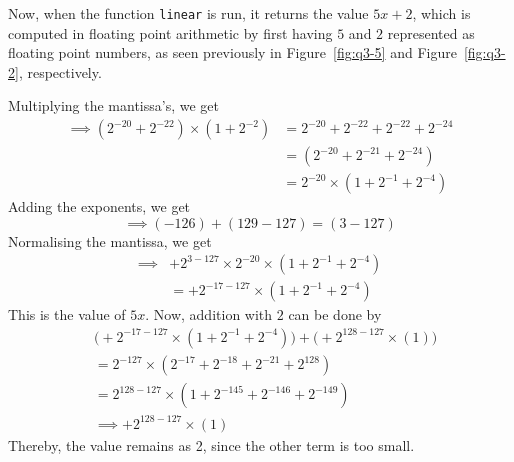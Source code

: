 Now, when the function \texttt{linear} is run, it returns the value \( 5x + 2 \), which is computed in floating point arithmetic by first having \( 5 \) and \( 2 \) represented as floating point numbers, as seen previously in Figure~\ref{fig:q3-5} and Figure~\ref{fig:q3-2}, respectively.

Multiplying the mantissa's, we get
\begin{align*}
    \implies
    (2^{-20} + 2^{-22}) \times (1 + 2^{-2})
     & =
    2^{-20} + 2^{-22} + 2^{-22} + 2^{-24}
    \\ & =
    (2^{-20} + 2^{-21}+ 2^{-24})
    \\ & =
    2^{-20} \times (1 + 2^{-1}+ 2^{-4})
\end{align*}
Adding the exponents, we get
\[
    \implies
    (-126) + (129 - 127)
    =
    (3 - 127)
\]
Normalising the mantissa, we get
\begin{align*}
    \implies
     &
    + 2^{3 - 127} \times 2^{-20} \times (1 + 2^{-1}+ 2^{-4})
    \\ & =
    + 2^{-17 - 127} \times (1 + 2^{-1}+ 2^{-4})
\end{align*}
This is the value of \( 5x \).
Now, addition with \( 2 \) can be done by
\begin{align*}
     &
    \Big( + 2^{-17 - 127} \times (1 + 2^{-1}+ 2^{-4}) \Big)
    +
    \Big( + 2^{128 - 127} \times (1) \Big)
    \\ & =
    2^{-127} \times (2^{-17} + 2^{-18} + 2^{-21} + 2^{128})
    \\ & =
    2^{128 - 127} \times (1 + 2^{-145} + 2^{-146} + 2^{-149})
    \\ & \implies
    + 2^{128 - 127} \times (1)
\end{align*}
Thereby, the value remains as 2, since the other term is too small.
